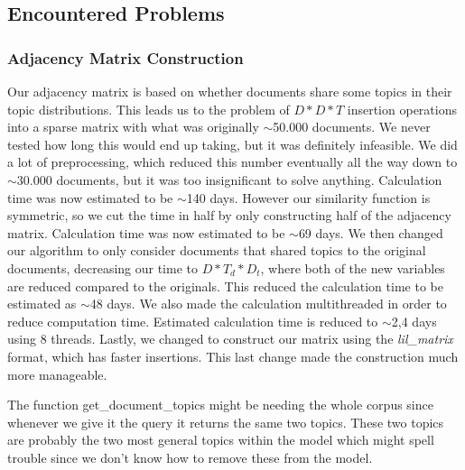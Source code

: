 \subsection{Encountered Problems}

\subsubsection{Adjacency Matrix Construction}\label{app:adj_matrix}
Our adjacency matrix is based on whether documents share some topics in their topic distributions. 
This leads us to the problem of $D*D*T$ insertion operations into a sparse matrix with what was originally $\sim$50.000 documents.
We never tested how long this would end up taking, but it was definitely infeasible.
We did a lot of preprocessing, which reduced this number eventually all the way down to $\sim$30.000 documents, but it was too insignificant to solve anything.
Calculation time was now estimated to be $\sim$140 days.
However our similarity function is symmetric, so we cut the time in half by only constructing half of the adjacency matrix.
Calculation time was now estimated to be $\sim$69 days.
We then changed our algorithm to only consider documents that shared topics to the original documents, decreasing our time to $D*T_d*D_t$, where both of the new variables are reduced compared to the originals.
This reduced the calculation time to be estimated as $\sim$48 days.
We also made the calculation multithreaded in order to reduce computation time.
Estimated calculation time is reduced to $\sim$2,4 days using 8 threads.
Lastly, we changed to construct our matrix using the \emph{lil\_matrix} format, which has faster insertions.
This last change made the construction much more manageable.


The function get\_document\_topics might be needing the whole corpus since whenever we give it the query it returns the same two topics. 
These two topics are probably the two most general topics within the model which might spell trouble since we don't know how to remove these from the model.

